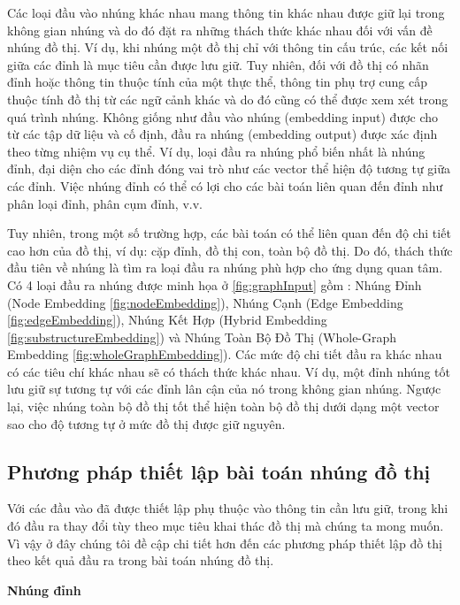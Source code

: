 Các loại đầu vào nhúng khác nhau mang thông tin khác nhau được giữ lại trong không gian nhúng và do đó đặt ra những thách thức khác nhau đối với vấn đề nhúng đồ thị. 
Ví dụ, khi nhúng một đồ thị chỉ với thông tin cấu trúc, các kết nối giữa các đỉnh là mục tiêu cần được lưu giữ. Tuy nhiên, đối với đồ thị có nhãn đỉnh hoặc thông tin thuộc tính của một thực thể, thông tin phụ trợ cung cấp thuộc tính đồ thị từ các ngữ cảnh khác và do đó cũng có thể được xem xét trong quá trình nhúng. Không giống như đầu vào nhúng (embedding input) được cho từ các tập dữ liệu và cố định, đầu ra nhúng (embedding output) được xác định theo từng nhiệm vụ cụ thể.
Ví dụ, loại đầu ra nhúng phổ biến nhất là nhúng đỉnh, đại diện cho các đỉnh đóng vai trò như các vector thể hiện độ tương tự giữa các đỉnh. Việc nhúng đỉnh có thể có lợi cho các bài toán liên quan đến đỉnh như phân loại đỉnh, phân cụm đỉnh, v.v.

Tuy nhiên, trong một số trường hợp, các bài toán có thể liên quan đến độ chi tiết cao hơn của đồ thị, ví dụ: cặp đỉnh, đồ thị con, toàn bộ đồ thị. Do đó, thách thức đầu tiên về nhúng là tìm ra loại đầu ra nhúng phù hợp cho ứng dụng quan tâm. Có 4 loại đầu ra nhúng được minh họa ở \autoref{fig:graphInput} gồm : Nhúng Đỉnh (Node Embedding \ref{fig:nodeEmbedding}), Nhúng Cạnh (Edge Embedding \ref{fig:edgeEmbedding}), Nhúng Kết Hợp (Hybrid Embedding \ref{fig:substructureEmbedding}) và Nhúng Toàn Bộ Đồ Thị (Whole-Graph Embedding \ref{fig:wholeGraphEmbedding}). Các mức độ chi tiết đầu ra khác nhau có các tiêu chí khác nhau sẽ có thách thức khác nhau. Ví dụ, một đỉnh nhúng tốt lưu giữ sự tương tự với các đỉnh lân cận của nó trong không gian nhúng. Ngược lại, việc nhúng toàn bộ đồ thị tốt thể hiện toàn bộ đồ thị dưới dạng một vector sao cho độ tương tự ở mức đồ thị được giữ nguyên.

\subsection{Phương pháp thiết lập bài toán nhúng đồ thị}

Với các đầu vào đã được thiết lập phụ thuộc vào thông tin cần lưu giữ, trong khi đó đầu ra thay đổi tùy theo mục tiêu khai thác đồ thị mà chúng ta mong muốn. Vì vậy ở đây chúng tôi đề cập chi tiết hơn đến các phương pháp thiết lập đồ thị theo kết quả đầu ra trong bài toán nhúng đồ thị.

\textbf{Nhúng đỉnh}
\label{sec:nodeEmbedding}


